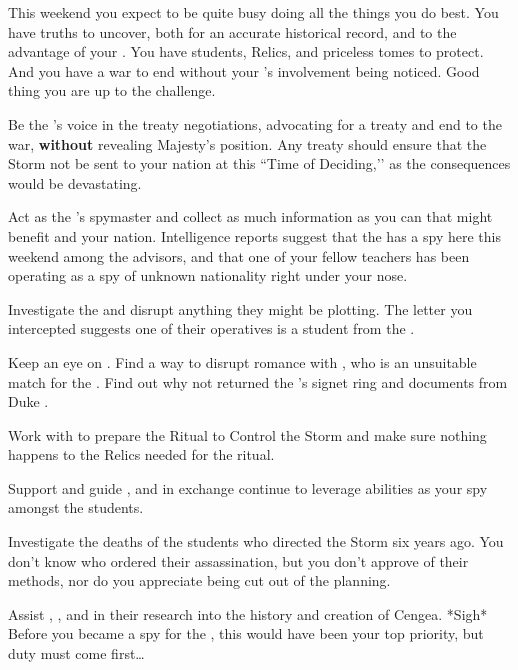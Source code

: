 \documentclass[char]{GL2020}
\begin{document}
This weekend you expect to be quite busy doing all the things you do best. You have truths to uncover, both for an accurate historical record, and to the advantage of your \cQueen{\Monarch}. You have students, Relics, and priceless tomes to protect. And you have a war to end without your \cQueen{\Monarch}’s involvement being noticed. Good thing you are up to the challenge.

\begin{itemz}
    \item Be the \cQueen{\Monarch}'s voice in the treaty negotiations, advocating for a treaty and end to the war, \textbf{without} revealing \cQueen{\Their} Majesty's position. Any treaty should ensure that the Storm not be sent to your nation at this ``Time of Deciding,’’ as the consequences would be devastating.
    \item Act as the \cQueen{\Monarch}'s spymaster and collect as much information as you can that might benefit \cQueen{\them} and your nation. Intelligence reports suggest that the \pTech{} has a spy here this weekend among the advisors, and that one of your fellow teachers has been operating as a spy of unknown nationality right under your nose.
    \item Investigate the \pGoaties{} and disrupt anything they might be plotting. The letter you intercepted suggests one of their operatives is a student from the \pFarm{}.
    \item Keep an eye on \cPrince{}. Find a way to disrupt \cPrince{\their} romance with \cPirate{}, who is an unsuitable match for the \cPrince{\heir}. Find out why \cPrince{\they} \cPrince{\have} not returned the \cQueen{\Monarch}'s signet ring and documents from Duke \cChupStudent{\formal}.
    \item Work with \cLibrarian{} to prepare the Ritual to Control the Storm and make sure nothing happens to the Relics needed for the ritual.
    \item Support and guide \cLibAssist{}, and in exchange continue to leverage \cLibAssist{\their} abilities as your spy amongst the students.
    \item Investigate the deaths of the students who directed the Storm six years ago. You don't know who ordered their assassination, but you don't approve of their methods, nor do you appreciate being cut out of the planning.
    \item Assist \cEbbPriest{}, \cHeadScientist{}, and \cScholarship{} in their research into the history and creation of Cengea. *Sigh* Before you became a spy for the \cQueen{\Monarch}, this would have been your top priority, but duty must come first…
\end{itemz}
\end{document}

